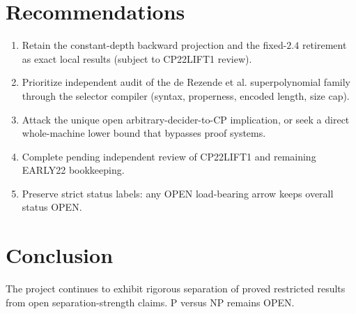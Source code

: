 \documentclass[11pt]{article}
\begin{document}
\section{Recommendations}
\begin{enumerate}
\item Retain the constant-depth backward projection and the fixed-\(2.4\) retirement as exact local results (subject to CP22LIFT1 review).
\item Prioritize independent audit of the de Rezende et al. superpolynomial family through the selector compiler (syntax, properness, encoded length, size cap).
\item Attack the unique open arbitrary-decider-to-CP implication, or seek a direct whole-machine lower bound that bypasses proof systems.
\item Complete pending independent review of CP22LIFT1 and remaining EARLY22 bookkeeping.
\item Preserve strict status labels: any OPEN load-bearing arrow keeps overall status OPEN.
\end{enumerate}

\section{Conclusion}
The project continues to exhibit rigorous separation of proved restricted results from open separation-strength claims.  P versus NP remains OPEN.

\end{document}
